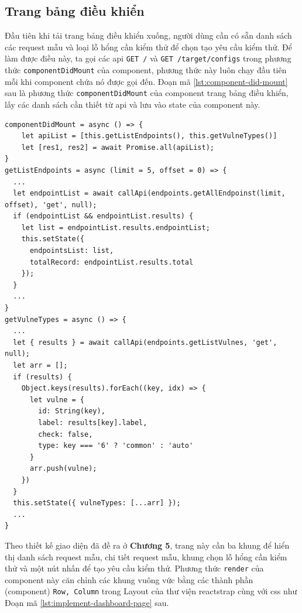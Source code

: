 \subsection{Trang bảng điều khiển}
Đầu tiên khi tải trang bảng điều khiển xuống, người dùng cần có sẵn danh sách các request mẫu và loại lỗ hổng cần kiểm thử để chọn tạo yêu cầu kiểm thử. Để làm được điều này, ta gọi các \acrshort{api} \colorbox{gray!30}{\texttt{GET /}} và \colorbox{gray!30}{\texttt{GET /target/configs}} trong phương thức \texttt{componentDidMount} của component, phương thức này luôn chạy đầu tiên mỗi khi component chứa nó được gọi đến. Đoạn mã \ref{lst:component-did-mount} sau là phương thức \texttt{componentDidMount} của component trang bảng điều khiển, lấy các danh sách cần thiết từ \acrshort{api} và lưu vào state của component này.
\begin{lstlisting}[style=ES6, label={lst:component-did-mount}, caption={Hiện thực các thành phần của trang bảng điều khiển}]
componentDidMount = async () => {
	let apiList = [this.getListEndpoints(), this.getVulneTypes()]
	let [res1, res2] = await Promise.all(apiList);
}
getListEndpoints = async (limit = 5, offset = 0) => {
  ...
  let endpointList = await callApi(endpoints.getAllEndpoinst(limit, offset), 'get', null);
  if (endpointList && endpointList.results) {
    let list = endpointList.results.endpointList;
    this.setState({
      endpointsList: list,
      totalRecord: endpointList.results.total
    });
  }
  ...
}
getVulneTypes = async () => {
  ...
  let { results } = await callApi(endpoints.getListVulnes, 'get', null);
  let arr = [];
  if (results) {
    Object.keys(results).forEach((key, idx) => {
      let vulne = {
        id: String(key),
        label: results[key].label,
        check: false,
        type: key === '6' ? 'common' : 'auto'
      }
      arr.push(vulne);
    })
  }
  this.setState({ vulneTypes: [...arr] });
  ...
}
\end{lstlisting}
Theo thiết kế giao diện đã đề ra ở \textbf{Chương 5}, trang này cần ba khung để hiển thị danh sách request mẫu, chi tiết request mẫu, khung chọn lỗ hổng cần kiểm thử và một nút nhấn để tạo yêu cầu kiểm thử. Phương thức \texttt{render} của component này căn chỉnh các khung vuông vức bằng các thành phần (component) \texttt{Row, Column} trong Layout của thư viện reactstrap cùng với \acrshort{css} như Đoạn mã \ref{lst:implement-dashboard-page} sau.
